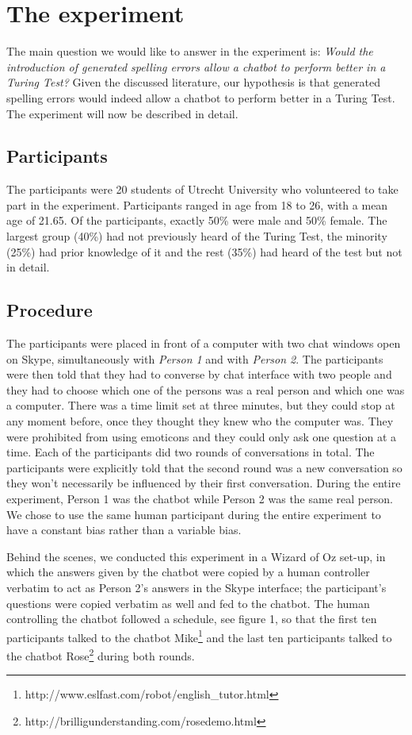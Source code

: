 \section{The experiment}
The main question we would like to answer in the experiment is: \textit{Would the introduction of generated spelling errors allow a chatbot to perform better in a Turing Test?} Given the discussed literature, our hypothesis is that generated spelling errors would indeed allow a chatbot to perform better in a Turing Test. The experiment will now be described in detail.


\subsection{Participants}
The participants were 20 students of Utrecht University who volunteered to take part in the experiment. Participants ranged in age from 18 to 26, with a mean age of 21.65. Of the participants, exactly 50\% were male and 50\% female. The largest group (40\%) had not previously heard of the Turing Test, the minority (25\%) had prior knowledge of it and the rest (35\%) had heard of the test but not in detail.


\subsection{Procedure}
The participants were placed in front of a computer with two chat windows open on Skype, simultaneously with \textit{Person 1} and with \textit{Person 2}. The participants were then told that they had to converse by chat interface with two people and they had to choose which one of the persons was a real person and which one was a computer. There was a time limit set at three minutes, but they could stop at any moment before, once they thought they knew who the computer was. They were prohibited from using emoticons and they could only ask one question at a time. Each of the participants did two rounds of conversations in total. The participants were explicitly told that the second round was a new conversation so they won't necessarily be influenced by their first conversation. During the entire experiment, Person 1 was the chatbot while Person 2 was the same real person. We chose to use the same human participant during the entire experiment to have a constant bias rather than a variable bias.

Behind the scenes, we conducted this experiment in a Wizard of Oz set-up, in which the answers given by the chatbot were copied by a human controller verbatim to act as Person 2's answers in the Skype interface; the participant's questions were copied verbatim as well and fed to the chatbot. The human controlling the chatbot followed a schedule, see figure 1, so that the first ten participants talked to the chatbot Mike\footnote{http://www.eslfast.com/robot/english\_tutor.html} and the last ten participants talked to the chatbot Rose\footnote{http://brilligunderstanding.com/rosedemo.html} during both rounds.

